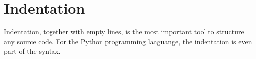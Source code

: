 \section{Indentation}\label{sec:Indentation}
Indentation, together with empty lines, is the most important tool to structure any source code. For the Python programming languange, the indentation is even part of the syntax\autocite{W3SCHOOLS:PythonIndentation}.





